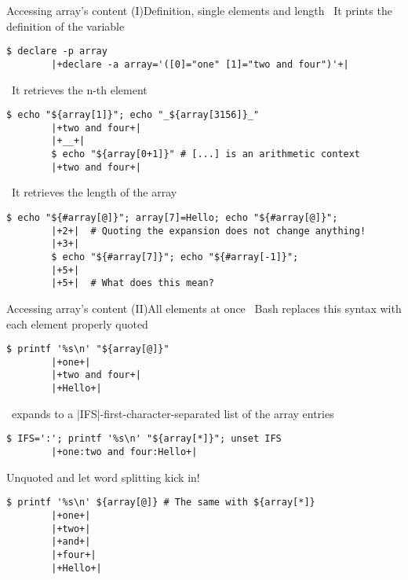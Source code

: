 \begin{frame}[fragile]{Accessing array's content (I)}{Definition, single elements and length}
    \vspace{-2mm}\centering
    \, It prints the definition of the variable 
    \smallskip
    \begin{lstlisting}[style=MyBash, numbers=none]
        $ declare -p array
        |+declare -a array='([0]="one" [1]="two and four")'+|
    \end{lstlisting}
    \medskip
    \, It retrieves the n-th element 
    \smallskip
    \begin{lstlisting}[style=MyBash, numbers=none]
        $ echo "${array[1]}"; echo "_${array[3156]}_"
        |+two and four+|
        |+__+|
        $ echo "${array[0+1]}" # [...] is an arithmetic context
        |+two and four+|
    \end{lstlisting}
    \medskip
    \, It retrieves the length of the array 
    \smallskip
    \begin{lstlisting}[style=MyBash, numbers=none]
        $ echo "${#array[@]}"; array[7]=Hello; echo "${#array[@]}";
        |+2+|  # Quoting the expansion does not change anything!
        |+3+|
        $ echo "${#array[7]}"; echo "${#array[-1]}";
        |+5+|
        |+5+|  # What does this mean?
    \end{lstlisting}
\end{frame}
\begin{frame}[fragile]{Accessing array's content (II)}{All elements at once}
    \vspace{-2mm}\centering
    \, Bash replaces this syntax with each element properly quoted
    \smallskip
    \begin{lstlisting}[style=MyBash, numbers=none]
        $ printf '%s\n' "${array[@]}"
        |+one+|
        |+two and four+|
        |+Hello+|
    \end{lstlisting}
    \medskip
    \, expands to a \bash|IFS|-first-character-separated list of the array entries
    \smallskip
    \begin{lstlisting}[style=MyBash, numbers=none]
        $ IFS=':'; printf '%s\n' "${array[*]}"; unset IFS
        |+one:two and four:Hello+|
    \end{lstlisting}
    \medskip
    Unquoted  and  let \alert{word splitting} kick in!
    \smallskip
    \begin{lstlisting}[style=MyBash, numbers=none]
        $ printf '%s\n' ${array[@]} # The same with ${array[*]}
        |+one+|
        |+two+|
        |+and+|
        |+four+|
        |+Hello+|
    \end{lstlisting}
\end{frame}

